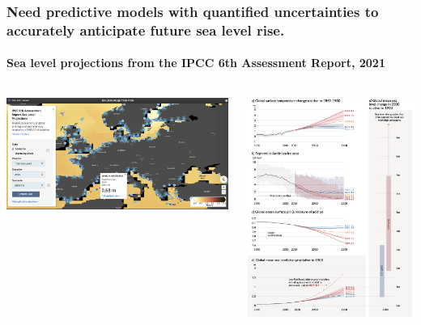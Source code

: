 \documentclass[10pt,final,xcolor=dvipsnames]{beamer}
\begin{document}
\begin{frame}
  \frametitle{Need predictive models with quantified uncertainties to accurately anticipate future sea
   level rise.}
\framesubtitle{Sea level projections from the IPCC 6th Assessment Report, 2021}
 \vspace{0.2in}
  \begin{columns}
    \begin{column}{0.7\paperwidth}
       \centering\includegraphics[width=0.85\columnwidth]{extraplots/venezia}
    \end{column}
    \hspace{-0.4in}
    \begin{column}{0.3\paperwidth}
    \vspace{0.1in}
      \centering\includegraphics[width=0.85\columnwidth]{extraplots/ipcc-ar6-wgi-2021.png}
    \end{column}
  \end{columns}


\end{frame}
\end{document}
